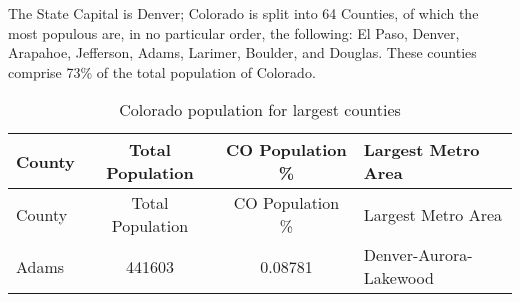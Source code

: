 \documentclass[]{article}
\begin{document}
The State Capital is Denver; Colorado is split into 64 Counties, of
which the most populous are, in no particular order, the following: El
Paso, Denver, Arapahoe, Jefferson, Adams, Larimer, Boulder, and Douglas.
These counties comprise 73\% of the total population of Colorado.

\begin{longtable}[]{@{}lccl@{}}
\caption{Colorado population for largest counties
\label{tab:pop_table}}\tabularnewline
\toprule
\begin{minipage}[b]{0.13\columnwidth}\raggedright\strut
County\strut
\end{minipage} & \begin{minipage}[b]{0.21\columnwidth}\centering\strut
Total Population\strut
\end{minipage} & \begin{minipage}[b]{0.20\columnwidth}\centering\strut
CO Population \%\strut
\end{minipage} & \begin{minipage}[b]{0.34\columnwidth}\raggedright\strut
Largest Metro Area\strut
\end{minipage}\tabularnewline
\midrule
\endfirsthead
\toprule
\begin{minipage}[b]{0.13\columnwidth}\raggedright\strut
County\strut
\end{minipage} & \begin{minipage}[b]{0.21\columnwidth}\centering\strut
Total Population\strut
\end{minipage} & \begin{minipage}[b]{0.20\columnwidth}\centering\strut
CO Population \%\strut
\end{minipage} & \begin{minipage}[b]{0.34\columnwidth}\raggedright\strut
Largest Metro Area\strut
\end{minipage}\tabularnewline
\midrule
\endhead
\begin{minipage}[t]{0.13\columnwidth}\raggedright\strut
Adams\strut
\end{minipage} & \begin{minipage}[t]{0.21\columnwidth}\centering\strut
441603\strut
\end{minipage} & \begin{minipage}[t]{0.20\columnwidth}\centering\strut
0.08781\strut
\end{minipage} & \begin{minipage}[t]{0.34\columnwidth}\raggedright\strut
Denver-Aurora-Lakewood\strut
\end{minipage}\tabularnewline

\end{longtable}
\end{document}
